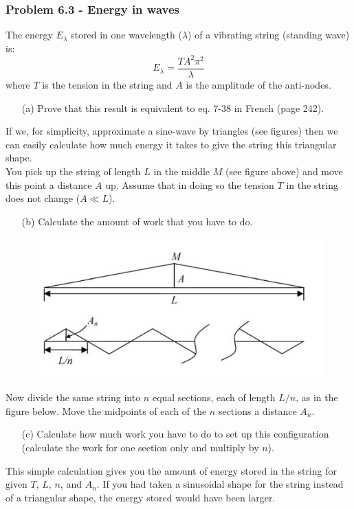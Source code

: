 \documentclass[12pt,a4paper]{article}
\begin{document}
\subsubsection*{Problem 6.3 - Energy in waves}
The energy $E_\lambda$ stored in one wavelength ($\lambda$) of a vibrating string (standing wave) is:
\[E_\lambda=\frac{TA^2\pi^2}{\lambda}\]
where $T$ is the tension in the string and $A$ is the amplitude of the anti-nodes.
\begin{enumerate}
    \item[(a)]Prove that this result is equivalent to eq. 7-38 in French (page 242). 
\end{enumerate}
If we, for simplicity, approximate a sine-wave by triangles (see figures) then we can easily calculate how much energy it takes to give the string this triangular shape.
\\You pick up the string of length $L$ in the middle $M$ (see figure above) and move this point a distance $A$ up. Assume that in doing so the tension $T$ in the string does not change ($A\ll L$).
\begin{enumerate}
    \item[(b)]Calculate the amount of work that you have to do.
\end{enumerate}
\begin{figure}[h]
    \centering
    \includegraphics[width=0.7\linewidth]{figs/fig_prob_6.3.png}
\end{figure}
Now divide the same string into $n$ equal sections, each of length $L/n$, as in the figure below. Move the midpoints of each of the $n$ sections a distance $A_n$.
\begin{enumerate}
    \item[(c)]Calculate how much work you have to do to set up this configuration (calculate the work for one section only and multiply by $n$). 
\end{enumerate}
This simple calculation gives you the amount of energy stored in the string for given $T$, $L$, $n$, and $A_n$. If you had taken a sinusoidal shape for the string instead of a triangular shape, the energy stored would have been larger.
\end{document}
